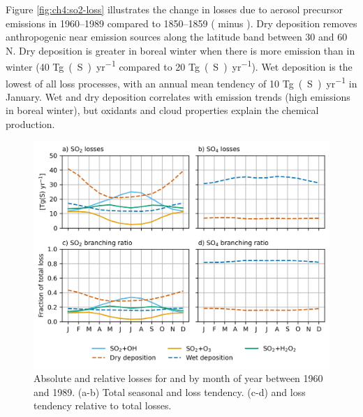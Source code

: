 Figure \ref{fig:ch4:so2-loss} illustrates the change in  losses due to aerosol precursor emissions in 1960--1989 compared to 1850--1859 (\histsst{} minus \sstpiaer{}). Dry deposition removes anthropogenic  near emission sources along the latitude band between 30 and 60 \textdegree N. Dry deposition is greater in boreal winter when there is more emission than in winter (40 \unit{Tg(S)~yr^{-1}} compared to 20 \unit{Tg(S)~yr^{-1}}). Wet deposition is the lowest of all loss processes, with an annual mean tendency of 10 \unit{Tg(S)~yr^{-1}} in January. Wet and dry deposition correlates with emission trends (high emissions in boreal winter), but oxidants and cloud properties explain the chemical production.





\begin{figure}
    \centering
    \includegraphics{Chapter4/Figs/branching_ratio_histsst_pothole.png}
    \caption[Absolute and relative losses for  and  by month of year between 1960 and 1989]{Absolute and relative losses for  and  by month of year between 1960 and 1989. (a-b) Total seasonal  and  loss tendency. (c-d)  and  loss tendency relative to total losses.}
    \label{fig:ch4:seasonal-branching-ratio}
\end{figure}


